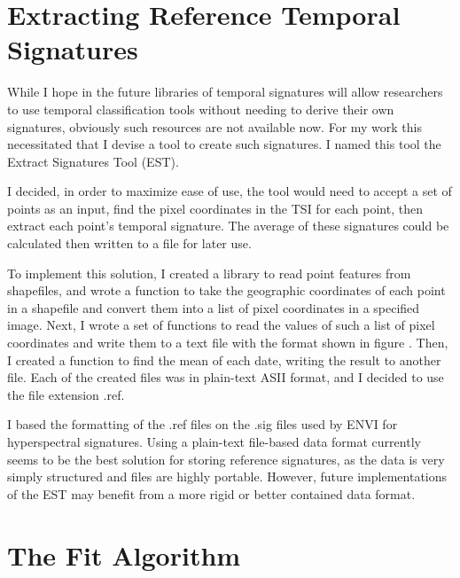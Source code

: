 \section{Extracting Reference Temporal Signatures}
\label{appendix:tools:extract}

While I hope in the future libraries of temporal signatures will allow researchers to use temporal classification tools without needing to derive their own signatures, obviously such resources are not available now. For my work this necessitated that I devise a tool to create such signatures. I named this tool the Extract Signatures Tool (EST).

I decided, in order to maximize ease of use, the tool would need to accept a set of points as an input, find the pixel coordinates in the TSI for each point, then extract each point’s temporal signature. The average of these signatures could be calculated then written to a file for later use.

To implement this solution, I created a library to read point features from shapefiles, and wrote a function to take the geographic coordinates of each point in a shapefile and convert them into a list of pixel coordinates in a specified image. Next, I wrote a set of functions to read the values of such a list of pixel coordinates and write them to a text file with the format shown in figure . Then, I created a function to find the mean of each date, writing the result to another file. Each of the created files was in plain-text ASII format, and I decided to use the file extension .ref.


I based the formatting of the .ref files on the .sig files used by ENVI for hyperspectral signatures. Using a plain-text file-based data format currently seems to be the best solution for storing reference signatures, as the data is very simply structured and files are highly portable. However, future implementations of the EST may benefit from a more rigid or better contained data format.

\section{The Fit Algorithm}
\label{appendix:tools:fit}

